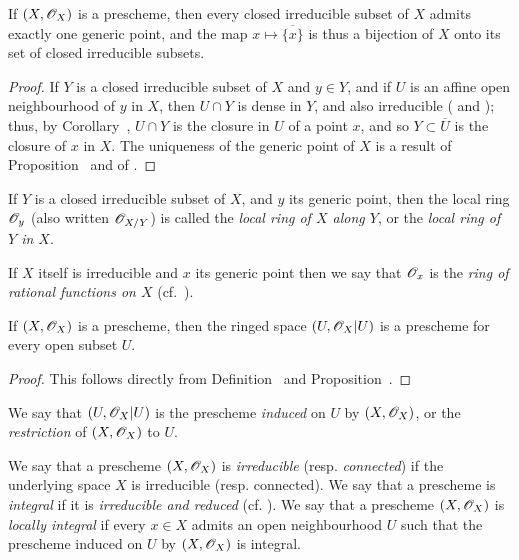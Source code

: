 \begin{proposition}[2.1.5]
\label{I.2.1.5}
If $(X,\mathscr{O}_X)$ is a prescheme, then every closed irreducible subset of $X$ admits exactly one generic point, and the map $x\mapsto\overline{\{x\}}$ is thus a bijection of $X$ onto its set of closed irreducible subsets.
\end{proposition}

\begin{proof}
If $Y$ is a closed irreducible subset of $X$ and $y\in Y$, and if $U$ is an affine open neighbourhood of $y$ in $X$, then $U\cap Y$ is dense in $Y$, and also irreducible ( and );
thus, by Corollary~, $U\cap Y$ is the closure in $U$ of a point $x$, and so $Y\subset\overline{U}$ is the closure of $x$ in $X$.
The uniqueness of the generic point of $X$ is a result of Proposition~ and of .
\end{proof}

\begin{env}[2.1.6]
\label{I.2.1.6}
If $Y$ is a closed irreducible subset of $X$, and $y$ its generic point, then the local ring $\mathscr{O}_y$ (also written $\mathscr{O}_{X/Y}$) is called the \emph{local ring of $X$ along $Y$}, or the \emph{local ring of $Y$ in $X$}.

If $X$ itself is irreducible and $x$ its generic point then we say that $\mathscr{O}_x$ is the \emph{ring of rational functions on $X$} (cf.~).
\end{env}

\begin{proposition}[2.1.7]
\label{I.2.1.7}
If $(X,\mathscr{O}_X)$ is a prescheme, then the ringed space $(U,\mathscr{O}_X|U)$ is a prescheme for every open subset $U$.
\end{proposition}

\begin{proof}
This follows directly from Definition~ and Proposition~.
\end{proof}

We say that $(U,\mathscr{O}_X|U)$ is the prescheme \emph{induced} on $U$ by $(X,\mathscr{O}_X)$, or the \emph{restriction} of $(X,\mathscr{O}_X)$ to $U$.

\begin{env}[2.1.8]
\label{I.2.1.8}
We say that a prescheme $(X,\mathscr{O}_X)$ is \emph{irreducible} (resp. \emph{connected}) if the underlying space $X$ is irreducible (resp. connected).
We say that a prescheme is \emph{integral} if it is \emph{irreducible and reduced} (cf. ).
We say that a prescheme $(X,\mathscr{O}_X)$ is \emph{locally integral} if every $x\in X$ admits an open neighbourhood $U$ such that the prescheme induced on $U$ by $(X,\mathscr{O}_X)$ is integral.
\end{env}

